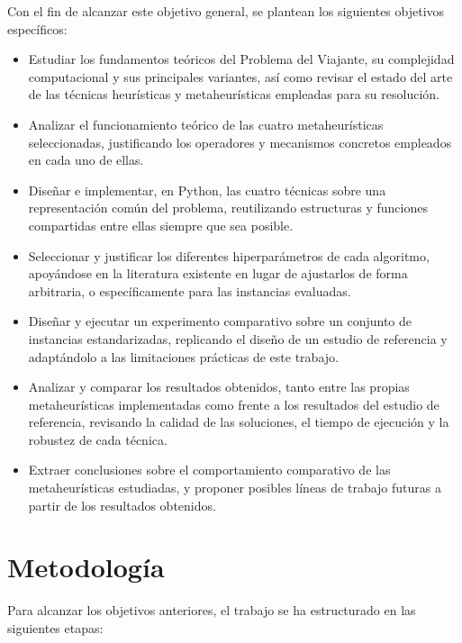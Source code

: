 Con el fin de alcanzar este objetivo general, se plantean los siguientes objetivos específicos:
\begin{itemize}
    \item Estudiar los fundamentos teóricos del Problema del Viajante, su complejidad computacional y sus principales 
    variantes, así como revisar el estado del arte de las técnicas heurísticas y metaheurísticas empleadas para su
    resolución.
    \item Analizar el funcionamiento teórico de las cuatro metaheurísticas seleccionadas, justificando los operadores
    y mecanismos concretos empleados en cada uno de ellas.
    \item Diseñar e implementar, en Python, las cuatro técnicas sobre una representación común del problema, reutilizando
    estructuras y funciones compartidas entre ellas siempre que sea posible.
    \item Seleccionar y justificar los diferentes hiperparámetros de cada algoritmo, apoyándose en la literatura existente
    en lugar de ajustarlos de forma arbitraria, o específicamente para las instancias evaluadas.
    \item Diseñar y ejecutar un experimento comparativo sobre un conjunto de instancias estandarizadas, replicando el diseño 
    de un estudio de referencia y adaptándolo a las limitaciones prácticas de este trabajo.
    \item Analizar y comparar los resultados obtenidos, tanto entre las propias metaheurísticas implementadas como frente a 
    los resultados del estudio de referencia, revisando la calidad de las soluciones, el tiempo de ejecución y la robustez
    de cada técnica.
    \item Extraer conclusiones sobre el comportamiento comparativo de las metaheurísticas estudiadas, y proponer posibles
    líneas de trabajo futuras a partir de los resultados obtenidos.
\end{itemize}


\section{Metodología}
\label{sec:metod}

Para alcanzar los objetivos anteriores, el trabajo se ha estructurado en las siguientes etapas:

